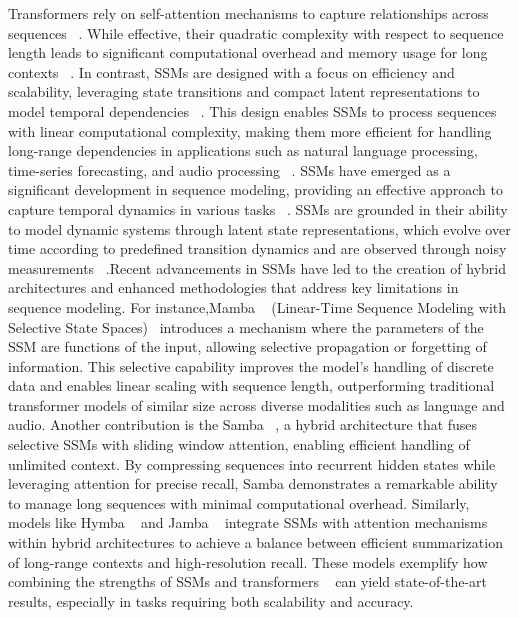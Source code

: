 Transformers rely on self-attention mechanisms to capture relationships across sequences ~\cite{vaswani2017attention}. While effective, their quadratic complexity with respect to sequence length leads to significant computational overhead and memory usage for long contexts ~\cite{taha2025logarithmicmemorynetworkslmns}. In contrast, SSMs are designed with a focus on efficiency and scalability, leveraging state transitions and compact latent representations to model temporal dependencies ~\cite{shakhadri2025sambaasrstateoftheartspeechrecognition}. This design enables SSMs to process sequences with linear computational complexity, making them more efficient for handling long-range dependencies in applications such as natural language processing, time-series forecasting, and audio processing ~\cite{liu2024masvspeakerverificationglobal}. SSMs have emerged as a significant development in sequence modeling, providing an effective approach to capture temporal dynamics in various tasks ~\cite{abreu2024qs5quantizedstatespace}. SSMs are grounded in their ability to model dynamic systems through latent state representations, which evolve over time according to predefined transition dynamics and are observed through noisy measurements ~\cite{wang2024statespacemodelnewgeneration}.Recent advancements in SSMs have led to the creation of hybrid architectures and enhanced methodologies that address key limitations in sequence modeling. For instance,Mamba ~\cite{gu2023mamba} (Linear-Time Sequence Modeling with Selective State Spaces)~\cite{gu2024mambalineartimesequencemodeling} introduces a mechanism where the parameters of the SSM are functions of the input, allowing selective propagation or forgetting of information. This selective capability improves the model's handling of discrete data and enables linear scaling with sequence length, outperforming traditional transformer models of similar size across diverse modalities such as language and audio. Another contribution is the Samba ~\cite{ren2024sambasimplehybridstate},  a hybrid architecture that fuses selective SSMs with sliding window attention, enabling efficient handling of unlimited context. By compressing sequences into recurrent hidden states while leveraging attention for precise recall, Samba demonstrates a remarkable ability to manage long sequences with minimal computational overhead. Similarly, models like Hymba ~\cite{dong2024hymbahybridheadarchitecturesmall} and Jamba ~\cite{lieber2024jamba} integrate SSMs with attention mechanisms within hybrid architectures to achieve a balance between efficient summarization of long-range contexts and high-resolution recall. These models exemplify how combining the strengths of SSMs and transformers ~\cite{vaswani2017attention} can yield state-of-the-art results, especially in tasks requiring both scalability and accuracy.
